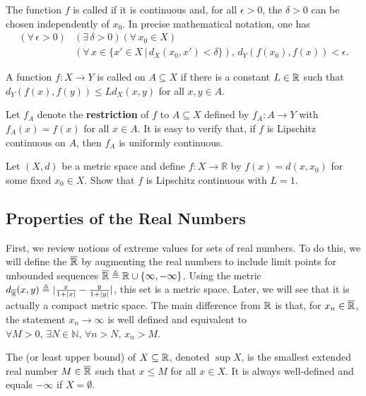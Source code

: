 \begin{definition}
The function $f$ is called  if it is continuous and, for all $\epsilon > 0$, the $\delta >0$ can be chosen independently of $x_0$.
In precise mathematical notation, one has
\begin{equation*}
\begin{split}
(\forall \, \epsilon >0)  & ( \exists \, \delta >0) (\forall \, x_0 \in X) \\ & (\forall \, x \in \{x'\in X\,|\,d_X (x_0,x')<\delta\}), \,
  d_Y \left( f(x_0),f(x) \right) < \epsilon .
\end{split}
\end{equation*}
\end{definition}

\begin{definition}
A function $f  \colon X \rightarrow Y$ is called  on $A \subseteq X$ if there is a constant $L \in \mathbb{R}$ such that $d_Y (f(x),f(y)) \leq L d_X (x,y)$ for all $x,y\in A$.
\end{definition}

Let $f_A$ denote the \textbf{restriction} of $f$ to $A\subseteq X$ defined by $f_A \colon A \to Y$ with $f_A (x) = f(x)$ for all $x\in A$.
It is easy to verify that, if $f$ is Lipschitz continuous on $A$, then $f_A$ is uniformly continuous.

\begin{problem}
Let $(X,d)$ be a metric space and define $f: X \to \mathbb{R}$ by $f(x)=d(x,x_0)$ for some fixed $x_0 \in X$.
Show that $f$ is Lipschitz continuous with $L=1$.
\end{problem}


\subsection{Properties of the Real Numbers}

First, we review notions of extreme values for sets of real numbers.
To do this, we will define the  $\overline{\mathbb{R}}$ by augmenting the real numbers to include limit points for unbounded sequences $\overline{\mathbb{R}} \triangleq \mathbb{R} \cup \{ \infty,-\infty\}$.
Using the metric $d_{\overline{\mathbb{R}}} (x,y) \triangleq |\frac{x}{1+|x|} - \frac{y}{1+|y|}|$, this set is a metric space.
Later, we will see that it is actually a compact metric space.
The main difference from $\mathbb{R}$ is that, for  $x_n \in \overline{\mathbb{R}}$, the statement  $x_n \to \infty$ is well defined and equivalent to $\forall M>0, \, \exists N\in \mathbb{N}, \, \forall n>N, \, x_n > M$.
\begin{definition}
The  (or least upper bound) of $X\subseteq \mathbb{R}$, denoted $\sup X$, is the smallest extended real number $M \in \overline{\mathbb{R}}$ such that $x\leq M$ for all $x\in X$.
It is always well-defined and equals $-\infty$ if $X=\emptyset$.
\end{definition}

